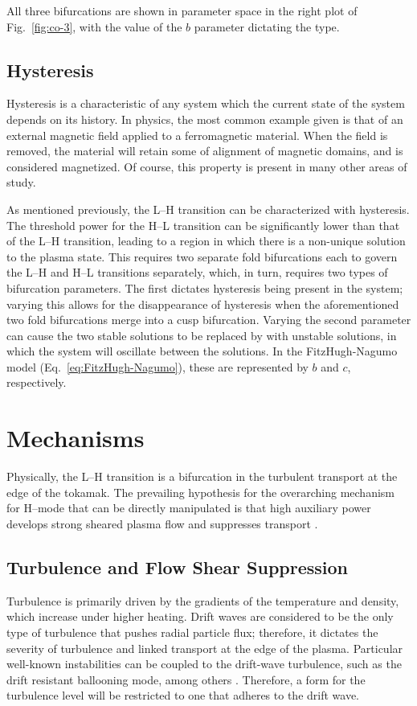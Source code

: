 All three bifurcations are shown in parameter space in the right plot of Fig.~\ref{fig:co-3}, with the value of the $b$ parameter dictating the type.

\subsection{Hysteresis}\label{ssec:hysteresis}
Hysteresis is a characteristic of any system which the current state of the system depends on its history.
In physics, the most common example given is that of an external magnetic field applied to a ferromagnetic material.
When the field is removed, the material will retain some of alignment of magnetic domains, and is considered magnetized.
Of course, this property is present in many other areas of study.

As mentioned previously, the L--H transition can be characterized with hysteresis.
The threshold power for the H--L transition can be significantly lower than that of the L--H transition, leading to a region in which there is a non-unique solution to the plasma state.
This requires two separate fold bifurcations each to govern the L--H and H--L transitions separately, which, in turn, requires two types of bifurcation parameters.
The first dictates hysteresis being present in the system; varying this allows for the disappearance of hysteresis when the aforementioned two fold bifurcations merge into a cusp bifurcation.
Varying the second parameter can cause the two stable solutions to be replaced by with unstable solutions, in which the system will oscillate between the solutions.
In the FitzHugh-Nagumo model (Eq.~\ref{eq:FitzHugh-Nagumo}), these are represented by $b$ and $c$, respectively.

\section{Mechanisms}\label{sec:mechanics}
Physically, the L--H transition is a bifurcation in the turbulent transport at the edge of the tokamak.
The prevailing hypothesis for the overarching mechanism for H--mode that can be directly manipulated is that high auxiliary power develops strong sheared plasma flow and suppresses transport \cite{freidberg_plasma_2007}.

\subsection{Turbulence and Flow Shear Suppression}\label{ssec:turbulence_sheared}
Turbulence is primarily driven by the gradients of the temperature and density, which increase under higher heating.
Drift waves are considered to be the only type of turbulence that pushes radial particle flux; therefore, it dictates the severity of turbulence and linked transport at the edge of the plasma.
Particular well-known instabilities can be coupled to the drift-wave turbulence, such as the drift resistant ballooning mode, among others \cite{scott_three-dimensional_1997}.
Therefore, a form for the turbulence level will be restricted to one that adheres to the drift wave.

